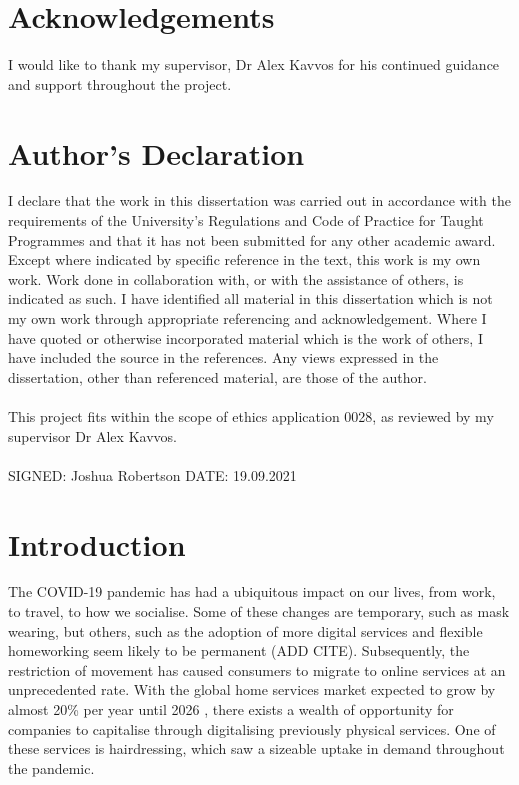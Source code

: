 \documentclass[12pt]{article}
\begin{document}
	\pagebreak

	\section*{Acknowledgements}
	I would like to thank my supervisor, Dr Alex Kavvos for his continued guidance and support throughout the project.
	\pagebreak
	
	\section*{Author's Declaration}

	I declare that the work in this dissertation was carried out in accordance with the 
	requirements of the University’s Regulations and Code of Practice for Taught Programmes 
	and that it has not been submitted for any other academic award.  Except where indicated 
	by specific reference in the text, this work is my own work. Work done in collaboration with, 
	or with the assistance of others, is indicated as such. I have identified all material in this 
	dissertation which is not my own work through appropriate referencing and 
	acknowledgement. Where I have quoted or otherwise incorporated material which is the 
	work of others, I have included the source in the references.  Any views expressed in the 
	dissertation, other than referenced material, are those of the author. 
	\\
	\\
	This project fits within the scope of ethics application 0028, as reviewed by my supervisor Dr Alex Kavvos.
	\\
	\\
	SIGNED: Joshua Robertson DATE: 19.09.2021 
	
	\pagebreak
	
	{
		\hypersetup{linkcolor=black}
		\tableofcontents
		\pagebreak
	
		\listoffigures
		\pagebreak
	}
	
	
	\section{Introduction}


	
	
	The COVID-19 pandemic has had a ubiquitous impact on our lives, from work, to travel, to how we socialise. Some of these changes are temporary, such as mask wearing, but others, such as the adoption of more digital services and flexible homeworking seem likely to be permanent (ADD CITE). 
	Subsequently, the restriction of movement has caused consumers to migrate to online services at an unprecedented rate. With the global home services market expected to grow by almost 20\% per year until 2026 \cite{ray28StatisticsHome2021}, there exists a wealth of opportunity for companies to capitalise through digitalising previously physical services. One of these services is hairdressing, which saw a sizeable uptake in demand throughout the pandemic. 
	\\
	
\end{document}
